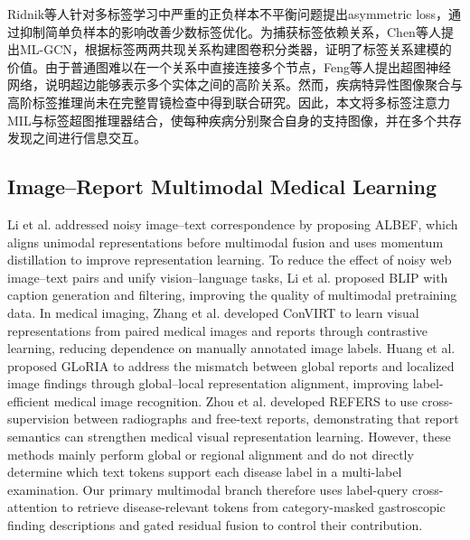 \documentclass[Afour,sagev,times]{sagej}
\begin{document}
Ridnik等人针对多标签学习中严重的正负样本不平衡问题提出asymmetric loss，通过抑制简单负样本的影响改善少数标签优化。为捕获标签依赖关系，Chen等人提出ML-GCN，根据标签两两共现关系构建图卷积分类器，证明了标签关系建模的价值。由于普通图难以在一个关系中直接连接多个节点，Feng等人提出超图神经网络，说明超边能够表示多个实体之间的高阶关系。然而，疾病特异性图像聚合与高阶标签推理尚未在完整胃镜检查中得到联合研究。因此，本文将多标签注意力MIL与标签超图推理器结合，使每种疾病分别聚合自身的支持图像，并在多个共存发现之间进行信息交互。

\subsection{Image--Report Multimodal Medical Learning}

Li et al. addressed noisy image--text correspondence by proposing ALBEF, which aligns unimodal representations before multimodal fusion and uses momentum distillation to improve representation learning.\cite{R19} To reduce the effect of noisy web image--text pairs and unify vision--language tasks, Li et al. proposed BLIP with caption generation and filtering, improving the quality of multimodal pretraining data.\cite{R20} In medical imaging, Zhang et al. developed ConVIRT to learn visual representations from paired medical images and reports through contrastive learning, reducing dependence on manually annotated image labels.\cite{R21} Huang et al. proposed GLoRIA to address the mismatch between global reports and localized image findings through global--local representation alignment, improving label-efficient medical image recognition.\cite{R22} Zhou et al. developed REFERS to use cross-supervision between radiographs and free-text reports, demonstrating that report semantics can strengthen medical visual representation learning.\cite{R23} However, these methods mainly perform global or regional alignment and do not directly determine which text tokens support each disease label in a multi-label examination. Our primary multimodal branch therefore uses label-query cross-attention to retrieve disease-relevant tokens from category-masked gastroscopic finding descriptions and gated residual fusion to control their contribution.
\end{document}
